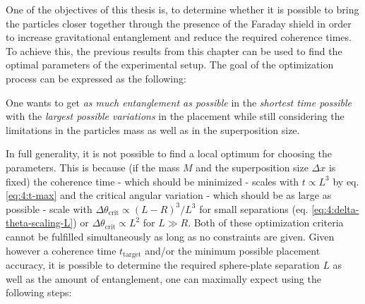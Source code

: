 One of the objectives of this thesis is, to determine whether it is possible to bring the particles closer together through the presence of the Faraday shield in order to increase gravitational entanglement and reduce the required coherence times.
To achieve this, the previous results from this chapter can be used to find the optimal parameters of the experimental setup.
The goal of the optimization process can be expressed as the following:

One wants to get \textit{as much entanglement as possible} in the \textit{shortest time possible} with the \textit{largest possible variations} in the placement while still considering the limitations in the particles mass as well as in the superposition size.

In full generality, it is not possible to find a local optimum for choosing the parameters. This is because (if the mass $M$ and the superposition size $\Delta x$ is fixed) the coherence time - which should be minimized - scales with $t \propto L^3$ by eq. \eqref{eq:4:t-max} and the critical angular variation - which should be as large as possible - scale with $\Delta \theta_\mathrm{crit} \propto (L-R)^3/L^3$ for small separations (eq. \eqref{eq:4:delta-theta-scaling-L}) or $\Delta \theta_\mathrm{crit} \propto L^2$ for $L \gg R$. Both of these optimization criteria cannot be fulfilled simultaneously as long as no constraints are given.
Given however a coherence time $t_\mathrm{target}$ and/or the minimum possible placement accuracy, it is possible to determine the required sphere-plate separation $L$ as well as the amount of entanglement, one can maximally expect using the following steps:
